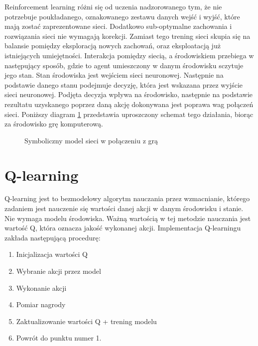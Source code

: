 Reinforcement learning różni się od uczenia nadzorowanego tym, że nie potrzebuje poukładanego, oznakowanego zestawu danych wejść i wyjść, które mają zostać zaprezentowane sieci. Dodatkowo sub-optymalne zachowania i rozwiązania sieci nie wymagają korekcji. Zamiast tego trening sieci skupia się na balansie pomiędzy eksploracją nowych zachowań, oraz eksploatacją już istniejących umiejętności.
Interakcja pomiędzy siecią, a środowiskiem przebiega w następujący sposób, gdzie to agent umieszczony w danym środowisku sczytuje jego stan. Stan środowiska jest wejściem sieci neuronowej. Następnie na podstawie danego stanu podejmuje decyzję, która jest wskazana przez wyjście sieci neuronowej. Podjęta decyzja wpływa na środowisko, następnie na podstawie rezultatu uzyskanego poprzez daną akcję dokonywana jest poprawa wag połączeń sieci. Poniższy diagram \ref{img:rf_learning_diagram} przedstawia uproszczony schemat tego działania, biorąc za środowisko grę komputerową.

\begin{figure}[h]
    \centering
    \caption{Symboliczny model sieci w połączeniu z grą}
    \label{img:rf_learning_diagram}
\end{figure}


\section{Q-learning}

Q-learning \cite{HandsOnQLearningWithPython} \cite{Qlearning} jest to bezmodelowy algorytm nauczania przez wzmacnianie, którego zadaniem jest nauczenie się wartości danej akcji w danym środowisku i stanie. Nie wymaga modelu środowiska. Ważną wartością w tej metodzie nauczania jest wartość Q, która oznacza jakość wykonanej akcji.
Implementacja Q-learningu zakłada następującą procedurę:

\begin{enumerate}
    \centering
    \item Inicjalizacja wartości Q
    \item Wybranie akcji przez model
    \item Wykonanie akcji
    \item Pomiar nagrody
    \item Zaktualizowanie wartości Q + trening modelu
    \item Powrót do punktu numer 1.
\end{enumerate}


